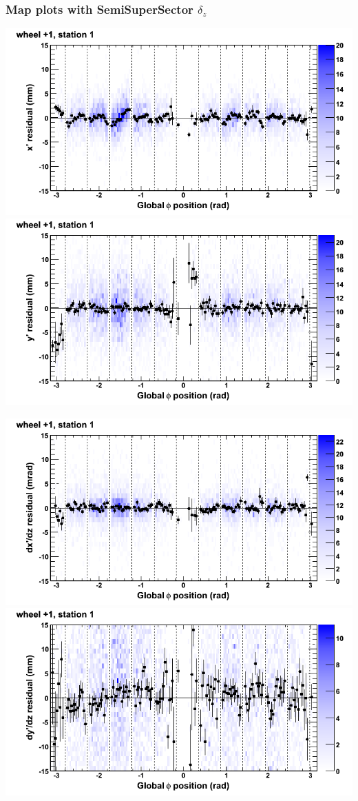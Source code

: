 \documentclass[compress]{beamer}
\begin{document}
\begin{frame}
\frametitle{Map plots with SemiSuperSector $\delta_z$}
\includegraphics[width=0.5\linewidth]{zfit_mapplots/DTvsphi_st1whD_x.png}
\includegraphics[width=0.5\linewidth]{zfit_mapplots/DTvsphi_st1whD_y.png}

\includegraphics[width=0.5\linewidth]{zfit_mapplots/DTvsphi_st1whD_dxdz.png}
\includegraphics[width=0.5\linewidth]{zfit_mapplots/DTvsphi_st1whD_dydz.png}
\end{frame}
\end{document}
